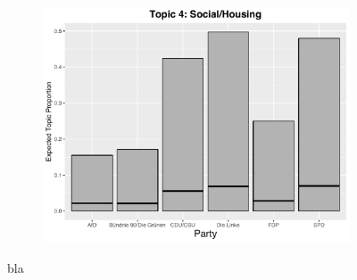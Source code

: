 \begin{figure}[h!]
\begin{subfigure}[b]{0.3\linewidth}
    \includegraphics[width=\linewidth]{../plots/appendix/4_4/direct_t4_cat.pdf}
  \end{subfigure}
  \caption{bla}
  \label{fig:coffee}
\end{figure}